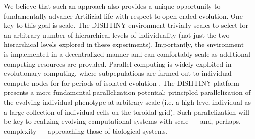 We believe that such an approach also provides a unique opportunity to fundamentally
advance %
Artificial life with respect to open-ended evolution.
One key to this goal is scale.
The DISHTINY environment %
trivially scales to select for an arbitrary number of hierarchical levels of individuality (not just the two hierarchical levels explored in these experiments).
Importantly, the environment is implemented in a %
decentralized manner
and can comfortably scale as additional computing resources are provided.
Parallel computing is widely exploited in evolutionary computing, where subpopulations are farmed out to individual compute nodes for for periods of isolated evolution %
\citep{lin1994coarse, real17a}.
The DISHTINY platform presents a more fundamental parallelization potential: principled parallelization of the evolving individual phenotype at arbitrary scale (i.e. a high-level individual as a large collection of individual cells on the toroidal grid).
Such parallelization will be key to realizing evolving computational systems with scale --- and, perhaps, complexity --- approaching those of biological systems.
